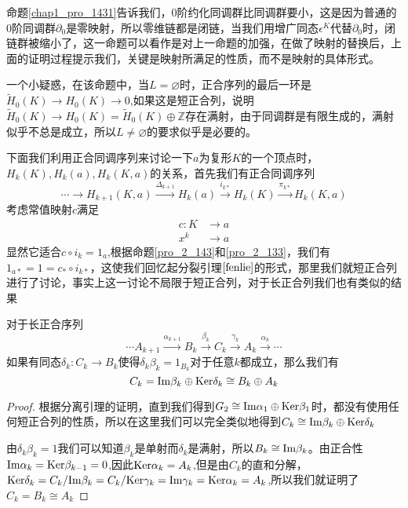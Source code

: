 \begin{remark}
命题\eqref{chap1_pro_1431}告诉我们，0阶约化同调群比同调群要小，这是因为普通的0阶同调群$\partial_{0}$是零映射，所以零维链都是闭链，当我们用增广同态$\epsilon^{K}$代替$\partial_{0}$时，闭链群被缩小了，这一命题可以看作是对上一命题的加强，在做了映射的替换后，上面的证明过程提示我们，关键是映射所满足的性质，而不是映射的具体形式。
\end{remark}
\begin{remark}
一个小疑惑，在该命题中，当$L=\varnothing$时，正合序列的最后一环是$\tilde{H}_{0}(K)\rightarrow H_{0}(K)\rightarrow 0$,如果这是短正合列，说明$\tilde{H}_{0}(K)\rightarrow H_{0}(K)=\tilde{H}_{0}(K)\oplus \mathbb{Z}$存在满射，由于同调群是有限生成的，满射似乎不总是成立，所以$L\neq\varnothing$的要求似乎是必要的。
\end{remark}
下面我们利用正合同调序列来讨论一下$a$为复形$K$的一个顶点时，$H_{k}(K),H_{k}(a),H_{k}(K,a)$的关系，首先我们有正合同调序列
$$\cdots\rightarrow H_{k+1}(K,a)\xrightarrow{\Delta_{k+1}}H_{k}(a)\xrightarrow{i_{k*}}H_{k}(K)\xrightarrow{\pi_{k*}}H_{k}(K,a)$$
考虑常值映射$c$满足
\begin{equation*}
    \begin{aligned}
    c:K&\rightarrow a\\
    x^{k}&\rightarrow a
    \end{aligned}
\end{equation*}
显然它适合$c\circ i_{k}=1_{a}$,根据命题\eqref{pro_2_143}和\eqref{pro_2_133}，我们有$1_{a*}=1=c_{*}\circ i_{k*}$，这使我们回忆起分裂引理$\eqref{fenlie}$的形式，那里我们就短正合列进行了讨论，事实上这一讨论不局限于短正合列，对于长正合列我们也有类似的结果
\begin{proposition}\label{fenlie2}
对于长正合序列$$\cdots A_{k+1}\xrightarrow{\alpha_{k+1}}B_{k}\xrightarrow{\beta_{k}}C_{k}\xrightarrow{\gamma_{k}}A_{k}\xrightarrow{\alpha_{k}}\cdots$$如果有同态$\delta_{k}:C_{k}\rightarrow B_{k}$使得$\delta_{k}\beta_{k}=1_{B_{k}}$对于任意$k$都成立，那么我们有$$C_{k}={\rm Im}\beta_{k}\oplus{\rm Ker}\delta_{k}\cong B_{k}\oplus A_{k}$$
\end{proposition}
\begin{proof}
根据分离引理的证明，直到我们得到$G_{2}\cong {\rm Im}\alpha_{1}\oplus{\rm Ker}\beta_{1}$时，都没有使用任何短正合列的性质，所以在这里我们可以完全类似地得到$C_{k}\cong {\rm Im}\beta_{k}\oplus{\rm Ker}\delta_{k}$

由$\delta_{k}\beta_{k}=1$我们可以知道$\beta_{k}$是单射而$\delta_{k}$是满射，所以$B_{k}\cong{\rm Im}\beta_{k}$。由正合性${\rm Im}\alpha_{k}={\rm Ker}\beta_{k-1}=0$,因此${\rm Ker}\alpha_{k}=A_{k}$,但是由$C_{k}$的直和分解，${\rm Ker}\delta_{k}=C_{k}/{\rm Im}\beta_{k}=C_{k}/{\rm Ker}\gamma_{k}={\rm Im}\gamma_{k}={\rm Ker}\alpha_{k}=A_{k}$,所以我们就证明了$C_{k}=B_{k}\cong A_{k}$
\end{proof}
